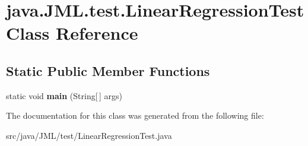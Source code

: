 \hypertarget{classjava_1_1_j_m_l_1_1test_1_1_linear_regression_test}{\section{java.\+J\+M\+L.\+test.\+Linear\+Regression\+Test Class Reference}
\label{classjava_1_1_j_m_l_1_1test_1_1_linear_regression_test}
}
\subsection*{Static Public Member Functions}
\begin{DoxyCompactItemize}
\item 
\hypertarget{classjava_1_1_j_m_l_1_1test_1_1_linear_regression_test_a883172d502741a937ceb914080558d5f}{static void {\bfseries main} (String\mbox{[}$\,$\mbox{]} args)}\label{classjava_1_1_j_m_l_1_1test_1_1_linear_regression_test_a883172d502741a937ceb914080558d5f}

\end{DoxyCompactItemize}


The documentation for this class was generated from the following file\+:\begin{DoxyCompactItemize}
\item 
src/java/\+J\+M\+L/test/Linear\+Regression\+Test.\+java\end{DoxyCompactItemize}
